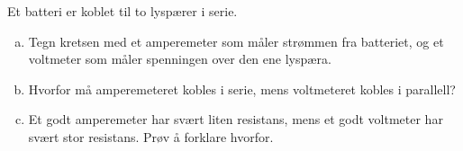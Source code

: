 %
Et batteri er koblet til to lyspærer i serie.
\begin{enumerate}[a)]
    \item Tegn kretsen med et amperemeter som måler strømmen fra batteriet, og et voltmeter som måler spenningen over den ene lyspæra.
    \item Hvorfor må amperemeteret kobles i serie, mens voltmeteret kobles i parallell?
    \item Et godt amperemeter har svært liten resistans, mens et godt voltmeter har svært stor resistans. Prøv å forklare hvorfor.
\end{enumerate}
%
